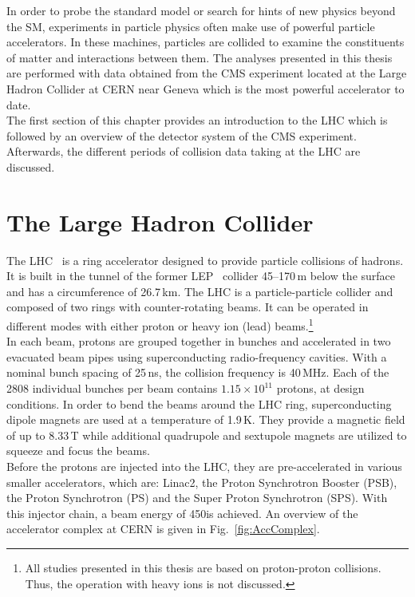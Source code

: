 In order to probe the standard model or search for hints of new physics beyond the SM, experiments in particle physics often make use of powerful particle accelerators. In these machines, particles are collided to examine the constituents of matter and interactions between them. The analyses presented in this thesis are performed with data obtained from the CMS experiment located at the Large Hadron Collider at CERN near Geneva which is the most powerful accelerator to date. \\ 
The first section of this chapter provides an introduction to the LHC which is followed by an overview of the detector system of the CMS experiment. Afterwards, the different periods of collision data taking at the LHC are discussed.  
\section{The Large Hadron Collider}
\label{sec:lhc}
The LHC~\cite{Bruning:782076, 1748-0221-3-08-S08001} is a ring accelerator designed to provide particle collisions of hadrons. It is built in the tunnel of the former LEP~\cite{LEPdesign} collider 45--170\,m below the surface and has a circumference of 26.7\,km. The LHC is a particle-particle collider and composed of two rings with counter-rotating beams. It can be operated in different modes with either proton or heavy ion (\eg lead) beams.\footnote{All studies presented in this thesis are based on proton-proton collisions. Thus, the operation with heavy ions is not discussed.} \\
In each beam, protons are grouped together in bunches and accelerated in two evacuated beam pipes using superconducting radio-frequency cavities. With a nominal bunch spacing of 25\,ns, the collision frequency is 40\,MHz. Each of the 2808 individual bunches per beam contains $1.15 \times 10^{11}$ protons, at design conditions. In order to bend the beams around the LHC ring, superconducting dipole magnets are used at a temperature of 1.9\,K. They provide a magnetic field of up to 8.33\,T while additional quadrupole and sextupole magnets are utilized to squeeze and focus the beams.\\  
Before the protons are injected into the LHC, they are pre-accelerated in various smaller accelerators, which are: Linac2, the Proton Synchrotron Booster (PSB), the Proton Synchrotron (PS) and the Super Proton Synchrotron (SPS). With this injector chain, a beam energy of 450\gev is achieved. An overview of the accelerator complex at CERN is given in Fig.~\ref{fig:AccComplex}. 
